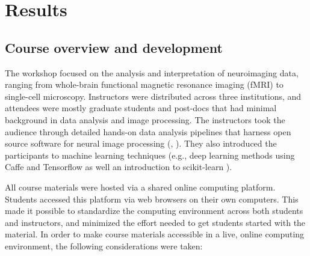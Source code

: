 \section{Results}

\subsection{Course overview and development}

The workshop focused on the analysis and interpretation of neuroimaging data,
ranging from whole-brain functional magnetic resonance imaging (fMRI) to
single-cell microscopy. Instructors were distributed across three institutions,
and attendees were mostly graduate students and post-docs that had minimal
background in data analysis and image processing. The instructors took the
audience through detailed hands-on data analysis pipelines that harness open
source software for neural image processing (\cite{van2014scikit}, \cite{Garyfallidis2014FrontNeuroinf}).
They also introduced the participants to
machine learning techniques (e.g., deep learning methods using Caffe
\cite{jia2014caffe} and Tensorflow \cite{abadi2016tensorflow} as well an
introduction to scikit-learn \cite{Pedregosa2012-dm}).

All course materials were hosted via a shared online computing platform.
Students accessed this platform via web browsers on their own computers.
This made it possible to standardize the computing environment across both
students and instructors, and minimized the effort needed to get students
started with the material. In order to make course materials accessible in a
live, online computing environment, the following considerations were taken:

